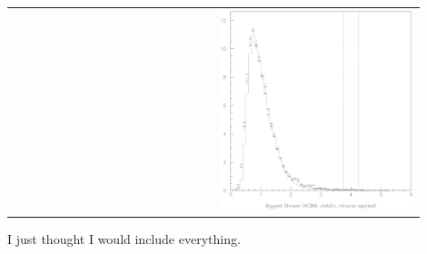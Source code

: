 \documentclass{article}
\begin{document}
\begin{center}
\begin{tabular}{p{0.45\linewidth} p{0.45\linewidth}}
\begin{minipage}{\linewidth}
    \end{minipage} &
    \begin{minipage}{\linewidth}
      \includegraphics[width=\linewidth]{biggestsh.eps}
    \end{minipage}
  \end{tabular}
\end{center}

\vfill
{\Huge I just thought I would include everything.}
\vfill
\end{document}
